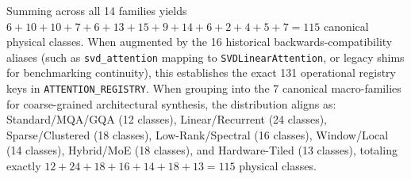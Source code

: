 Summing across all 14 families yields $6 + 10 + 10 + 7 + 6 + 13 + 15 + 9 + 14 + 6 + 2 + 4 + 5 + 7 = 115$ canonical physical classes. When augmented by the 16 historical backwards-compatibility aliases (such as \texttt{svd\_attention} mapping to \texttt{SVDLinearAttention}, or legacy shims for benchmarking continuity), this establishes the exact 131 operational registry keys in \texttt{ATTENTION\_REGISTRY}. When grouping into the 7 canonical macro-families for coarse-grained architectural synthesis, the distribution aligns as: Standard/MQA/GQA (12 classes), Linear/Recurrent (24 classes), Sparse/Clustered (18 classes), Low-Rank/Spectral (16 classes), Window/Local (14 classes), Hybrid/MoE (18 classes), and Hardware-Tiled (13 classes), totaling exactly $12 + 24 + 18 + 16 + 14 + 18 + 13 = 115$ physical classes.

